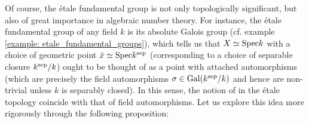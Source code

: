         Of course, the \'etale fundamental group is not only topologically significant, but also of great importance in algebraic number theory. For instance, the \'etale fundamental group of any field $k$ is its absolute Galois group (cf. example \ref{example: etale_fundamental_groups}), which tells us that $X \simeq \mathrm{Spec} k$ with a choice of geometric point $\bar{x} \simeq \mathrm{Spec} k^{\mathrm{sep}}$ (corresponding to a choice of separable closure $k^{\mathrm{sep}}/k$) ought to be thought of as a point with attached automorphisms (which are precisely the field automorphisms $\sigma \in \mathrm{Gal}(k^{\mathrm{sep}}/k)$ and hence are non-trivial unless $k$ is separably closed). In this sense, the notion of  in the \'etale topology coincide with that of field automorphisms. Let us explore this idea more rigorously through the following proposition:
        
